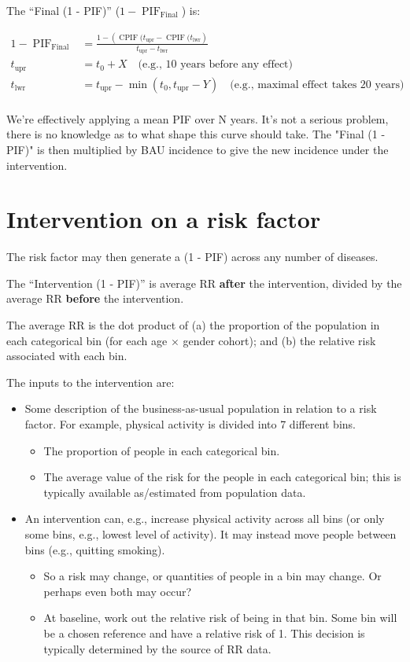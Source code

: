 \documentclass[12pt]{scrartcl}
\DeclareMathOperator{\PIF}{PIF}
\DeclareMathOperator{\CPIF}{CPIF}
\newcommand{\FPIF}{\ensuremath{1 - \PIF_{\mathrm{Final}}}}
\begin{document}
The ``Final (1 - PIF)'' (\(\FPIF\)) is:

\begin{align*}
  \FPIF &= \frac{1 - \left(\CPIF(t_\mathrm{upr} - \CPIF(t_\mathrm{lwr}\right)%
  }{t_\mathrm{upr} - t_\mathrm{lwr}} \\
  t_\mathrm{upr} &= t_0 + X \quad \text{(e.g., 10 years before any effect)} \\
  t_\mathrm{lwr} &= t_\mathrm{upr} - \min(t_0, t_\mathrm{upr} - Y)%
  \quad \text{(e.g., maximal effect takes 20 years)} \\
\end{align*}

We're effectively applying a mean PIF over N years. It's not a serious problem, there is no knowledge as to what shape this curve should take. The "Final (1 - PIF)" is then multiplied by BAU incidence to give the new incidence under the intervention.

\section*{Intervention on a risk factor}

The risk factor may then generate a (1 - PIF) across any number of diseases.

The ``Intervention (1 - PIF)'' is average RR \textbf{after} the intervention, divided by the average RR \textbf{before} the intervention.

The average RR is the dot product of (a) the proportion of the population in
each categorical bin (for each age \(\times\) gender cohort); and (b) the
relative risk associated with each bin.

The inputs to the intervention are:

\begin{itemize}
\item Some description of the business-as-usual population in relation to a risk factor. For example, physical activity is divided into 7 different bins.
  \begin{itemize}
  \item The proportion of people in each categorical bin.
  \item The average value of the risk for the people in each categorical bin; this is typically available as/estimated from population data.
  \end{itemize}
\item An intervention can, e.g., increase physical activity across all bins (or only some bins, e.g., lowest level of activity). It may instead move people between bins (e.g., quitting smoking).
  \begin{itemize}
  \item So a risk may change, or quantities of people in a bin may change. Or perhaps even both may occur?
  \item At baseline, work out the relative risk of being in that bin. Some bin will be a chosen reference and have a relative risk of 1. This decision is typically determined by the source of RR data.
  \end{itemize}
\end{itemize}
\end{document}
